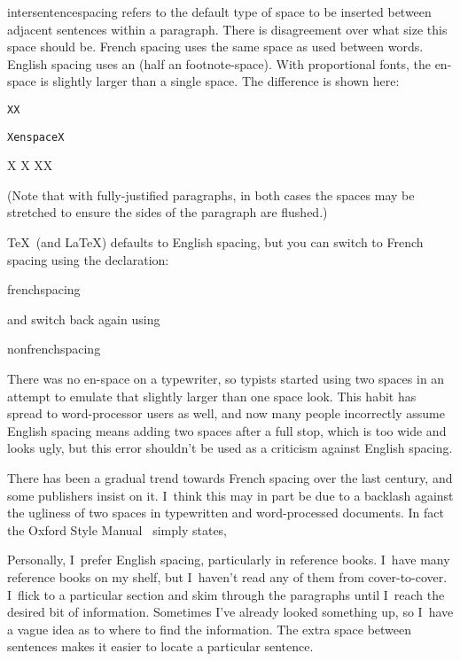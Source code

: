 \Gls*{intersentencespacing} refers to the default type of space
to be inserted between adjacent sentences within a paragraph. There is
disagreement over what size this space should be. French spacing
uses the same space as used between words. English spacing uses an
 (half an \doifbook
 {\csname footnote}-space). With proportional
fonts, the en-space is slightly larger than a
single space. The difference is shown here:
\begin{code}
\begin{alltt}
X X

X\gls{enspace} X
\end{alltt}
\end{code}
\begin{result}
X X
\glspar
X\enspace X
\end{result}
(Note that with fully-justified paragraphs, in both cases the spaces
may be stretched to ensure the sides of the paragraph are flushed.)

\TeX\ (and \LaTeX) defaults to English spacing, but you can switch
to French spacing using the declaration:
\begin{definition}
\gls{frenchspacing}
\end{definition}
and switch back again using
\begin{definition}
\gls{nonfrenchspacing}
\end{definition}

There was no en-space on a typewriter, so typists started using two
spaces in an attempt to emulate that slightly larger than one space
look. This habit has spread to word-processor users as well, and now
many people incorrectly assume English spacing means adding two
spaces after a full stop, which is too wide and looks ugly, but this
error shouldn't be used as a criticism against English spacing.

There has been a gradual trend towards French spacing over the last
century, and some publishers insist on it. I~think this may in part
be due to a backlash against the ugliness of two spaces in
typewritten and word-processed documents. In fact the Oxford Style
Manual~\cite{oxford} simply states, 

Personally, I~prefer English spacing, particularly in reference
books. I~have many reference books on my shelf, but I~haven't read
any of them from cover-to-cover. I~flick to a particular section and
skim through the paragraphs until I~reach the desired bit of
information. Sometimes I've already looked something up, so I~have a vague
idea as to where to find the information. The extra space between
sentences makes it easier to locate a particular sentence.

